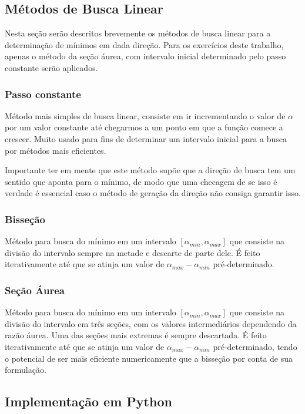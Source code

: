 \documentclass[10pt, a4paper]{article}
\begin{document}
\subsection{Métodos de Busca Linear}

Nesta seção serão descritos brevemente os métodos de busca linear para a determinação de mínimos em dada direção.
Para os exercícios deste trabalho, apenas o método da seção áurea, com intervalo inicial determinado pelo passo constante
serão aplicados.
\subsubsection{Passo constante}

Método mais simples de busca linear, consiste em ir incrementando o valor de $\alpha$ por um valor constante até
chegarmos a um ponto em que a função comece a crescer. Muito usado para fins de determinar um intervalo inicial para
a busca por métodos mais eficientes.

Importante ter em mente que este método supõe que a direção de busca tem um sentido que aponta para o mínimo, de modo
que uma checagem de se isso é verdade é essencial caso o método de geração da direção não consiga garantir isso.

\subsubsection{Bisseção}

Método para busca do mínimo em um intervalo $[\alpha_{min}, \alpha_{max}]$ que consiste na divisão do intervalo sempre na metade
e descarte de parte dele. É feito iterativamente até que se atinja um valor de $\alpha_{max}-\alpha_{min}$ pré-determinado.

\subsubsection{Seção Áurea}

Método para busca do mínimo em um intervalo $[\alpha_{min}, \alpha_{max}]$ que consiste na divisão do intervalo em três
seções, com os valores intermediários dependendo da razão áurea. Uma das seções mais extremas é sempre descartada. 
É feito iterativamente até que se atinja um valor de $\alpha_{max}-\alpha_{min}$ pré-determinado, tendo o potencial de
ser mais eficiente numericamente que a bisseção por conta de sua formulação.

\subsection{Implementação em Python}
\end{document}
